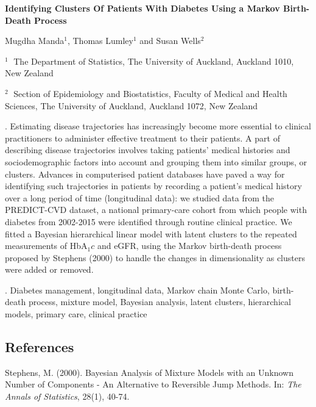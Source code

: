 \documentclass[12pt]{article}
\begin{document}
\begin{flushleft}


{\LARGE\bf Identifying Clusters Of Patients With Diabetes Using a Markov Birth-Death Process}


\vspace{1.0cm}

Mugdha Manda$^1$, Thomas Lumley$^1$ and Susan Wells$^2$

\begin{description}

\item $^1 \;$ The Department of Statistics, The University of Auckland, Auckland 1010, New Zealand

\item $^2 \;$ Section of Epidemiology and Biostatistics, Faculty of Medical and Health Sciences, The University of Auckland, Auckland 1072, New Zealand

\end{description}

\end{flushleft}

\vspace{1.2cm}

. Estimating disease trajectories has increasingly become more essential to clinical practitioners to administer effective treatment to their patients. A part of describing disease trajectories involves taking patients' medical histories and sociodemographic factors into account and grouping them into similar groups, or clusters. Advances in computerised patient databases have paved a way for identifying such trajectories in patients by recording a patient's medical history over a long period of time (longitudinal data): we studied data from the PREDICT-CVD dataset, a national primary-care cohort from which people with diabetes from 2002-2015 were identified through routine clinical practice. We fitted a Bayesian hierarchical linear model with latent clusters to the repeated measurements of HbA$_1c$ and eGFR, using the Markov birth-death process proposed by Stephens (2000) to handle the changes in dimensionality as clusters were added or removed.

\vskip 2mm

.
Diabetes management,
longitudinal data,
Markov chain Monte Carlo,
birth-death process,
mixture model,
Bayesian analysis,
latent clusters,
hierarchical models,
primary care,
clinical practice



\subsection*{References}

\begin{description}

\item
Stephens, M. (2000). Bayesian Analysis of Mixture Models with an Unknown Number of Components - An Alternative to Reversible Jump Methods. 
In: \textit{The Annals of Statistics}, 28(1), 40-74. 

\end{description}
\end{document}
